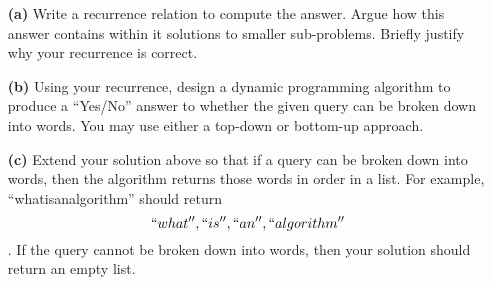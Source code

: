 \documentclass[11pt]{article}
\theoremstyle{definition}
\theoremstyle{theorem}
\begin{document}
\begin{itemize}
\item[{\bf (a)}] Write a recurrence relation to compute the answer. Argue how this answer contains within it solutions to smaller sub-problems. Briefly justify why your recurrence is correct.

\item[{\bf (b)}] Using your recurrence, design a dynamic programming algorithm to produce a ``Yes/No'' answer to whether the given query can be broken down into words.  You may use either a top-down or bottom-up approach.\\
\begin{algorithm}[H]
\end{algorithm}
  
\item[{\bf (c)}] Extend your solution above so that if a query can be broken down into words, then the algorithm returns those words in order in a list. For example, ``whatisanalgorithm'' should return \[``what'',``is'',``an'',``algorithm''\]. If the query cannot be broken down into words, then your solution should return an empty list. \\
\begin{algorithm}[H]
\end{algorithm}
\end{itemize}
\end{document}
